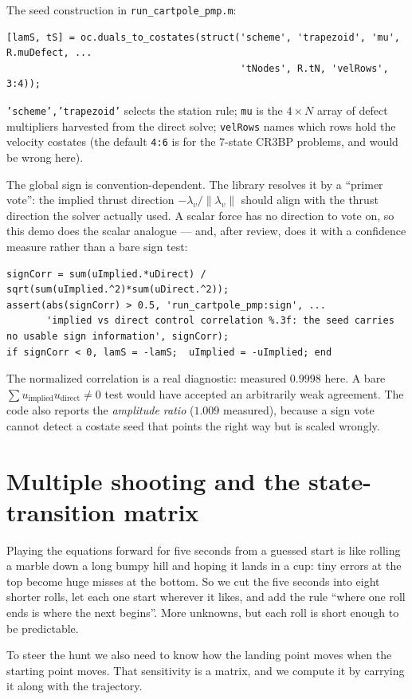 \documentclass[11pt]{article}
\newcommand{\file}[1]{\texttt{#1}}
\begin{document}
\begin{rig}
The seed construction in \file{run\_cartpole\_pmp.m}:

\begin{lstlisting}
[lamS, tS] = oc.duals_to_costates(struct('scheme', 'trapezoid', 'mu', R.muDefect, ...
                                         'tNodes', R.tN, 'velRows', 3:4));
\end{lstlisting}

\texttt{'scheme','trapezoid'} selects the station rule; \texttt{mu} is the
$4\times N$ array of defect multipliers harvested from the direct solve;
\texttt{velRows} names which rows hold the velocity costates (the default
\texttt{4:6} is for the 7-state CR3BP problems, and would be wrong here).

The global sign is convention-dependent. The library resolves it by a ``primer
vote'': the implied thrust direction $-\lambda_v/\|\lambda_v\|$ should align
with the thrust direction the solver actually used. A scalar force has no
direction to vote on, so this demo does the scalar analogue --- and, after
review, does it with a confidence measure rather than a bare sign test:

\begin{lstlisting}
signCorr = sum(uImplied.*uDirect) / sqrt(sum(uImplied.^2)*sum(uDirect.^2));
assert(abs(signCorr) > 0.5, 'run_cartpole_pmp:sign', ...
       'implied vs direct control correlation %.3f: the seed carries no usable sign information', signCorr);
if signCorr < 0, lamS = -lamS;  uImplied = -uImplied; end
\end{lstlisting}

The normalized correlation is a real diagnostic: measured $0.9998$ here. A bare
$\sum u_{\text{implied}}u_{\text{direct}}\neq 0$ test would have accepted an
arbitrarily weak agreement. The code also reports the \emph{amplitude ratio}
($1.009$ measured), because a sign vote cannot detect a costate seed that points
the right way but is scaled wrongly.
\end{rig}

\section{Multiple shooting and the state-transition matrix}\label{sec:stm}

\begin{eli}
Playing the equations forward for five seconds from a guessed start is like
rolling a marble down a long bumpy hill and hoping it lands in a cup: tiny
errors at the top become huge misses at the bottom. So we cut the five seconds
into eight shorter rolls, let each one start wherever it likes, and add the rule
``where one roll ends is where the next begins''. More unknowns, but each roll is
short enough to be predictable.

To steer the hunt we also need to know how the landing point moves when the
starting point moves. That sensitivity is a matrix, and we compute it by
carrying it along with the trajectory.
\end{eli}
\end{document}
